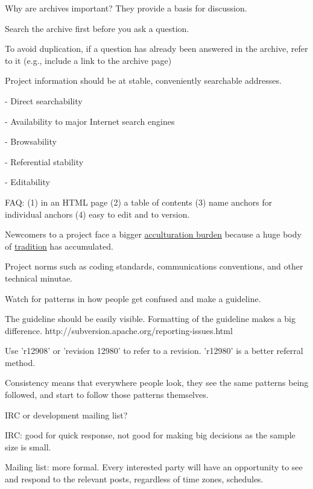 \documentclass[landscape,30pt]{foils}
\begin{document}
Why are archives important?  They provide a basis for discussion.

Search the archive first before you ask a question.

To avoid duplication, if a question has already been answered in the archive, refer to it (e.g., include a link to the archive page)



Project information should be at stable, conveniently searchable addresses.

- Direct searchability

- Availability to major Internet search engines

- Browsability

- Referential stability

- Editability 

FAQ: (1) in an HTML page (2) a table of contents (3) name anchors for individual anchors (4) easy to edit and to version.


Newcomers to a project face a bigger \underline{acculturation burden} because a huge body
of \underline{tradition} has accumulated.

Project norms such as coding standards, communications conventions, and other technical minutae.

Watch for patterns in how people get confused and make a guideline.

The guideline should be easily visible.  Formatting of the guideline makes a big difference.  http://subversion.apache.org/reporting-issues.html

Use 'r12908' or 'revision 12980' to refer to a revision.  'r12980' is a better referral method.

Consistency means that everywhere people look, they see the same patterns being followed, and start to follow those patterns
themselves.


IRC or development mailing list?

IRC: good for quick response, not good for making big decisions as the sample size is small.

Mailing list: more formal. Every interested party will have an opportunity to see and respond
to the relevant posts, regardless of time zones, schedules.
\end{document}
